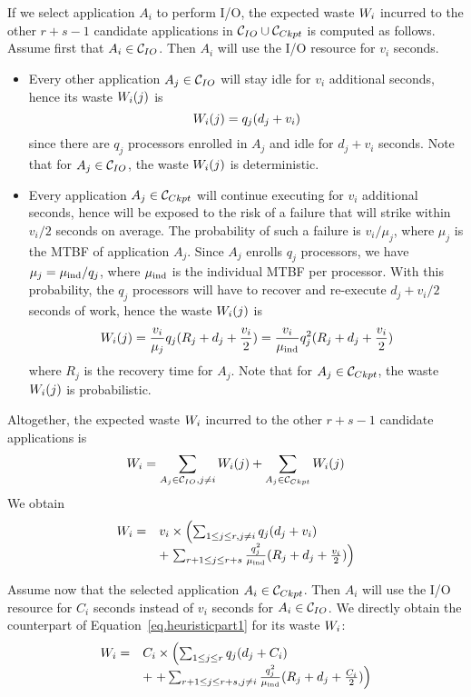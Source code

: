If we select application $A_{i}$ to perform I/O,  the expected waste $W_{i}$ incurred
to the other $r+s-1$ candidate applications in  $\mathcal{C}_{IO} \cup \mathcal{C}_{Ckpt}$ is computed as follows.
Assume first that $A_{i} \in \mathcal{C}_{IO}$. Then  $A_{i}$ will use the I/O resource for $v_{i}$ seconds.
\begin{itemize}
  \item Every other application $A_{j} \in \mathcal{C}_{IO}$ will stay idle for $v_{i}$ additional seconds,
  hence its waste $W_{i}(j)$ is
  $$W_{i}(j) = q_{j} (d_{j} + v_{i})$$
  since there are $q_{j}$ processors enrolled in $A_{j}$ and idle for $d_{j} + v_{i}$ seconds. Note that for $A_{j} \in \mathcal{C}_{IO}$, the waste $W_{i}(j)$ is deterministic.
  \item Every application $A_{j} \in \mathcal{C}_{Ckpt}$ will continue executing for $v_{i}$ additional seconds, hence will be exposed to the risk of a failure that will strike within $v_{i}/2$ seconds on average. The probability of such a failure is $v_{i}/\mu_{j}$, where $\mu_{j}$ is the
  MTBF of application $A_{j}$. Since $A_{j}$ enrolls $q_{j}$ processors, we have $\mu_{j} = \mu_{\text{ind}}/q_{j}$, where $\mu_{\text{ind}}$ is the individual MTBF per processor. With this probability,
  the $q_{j}$ processors will have to recover and re-execute $d_{j} + v_{i}/2$ seconds of work,
  hence the waste $W_{i}(j)$ is
     $$W_{i}(j) = \frac{v_{i}}{\mu_{j} } q_{j} (R_{j} + d_{j} + \frac{v_{i}}{2}) =
     \frac{v_{i}}{\mu_{\text{ind}}} q^{2}_{j} (R_{j} + d_{j} + \frac{v_{i}}{2})$$
     where $R_{j}$ is the recovery time for $A_{j}$.
Note that for $A_{j} \in \mathcal{C}_{Ckpt}$, the waste $W_{i}(j)$ is probabilistic.
 \end{itemize}
 Altogether, the expected waste $W_{i}$ incurred
to the other $r+s-1$ candidate applications is
$$W_{i} = \sum_{A_{j} \in \mathcal{C}_{IO}, j\neq i} W_{i}(j) + \sum_{A_{j} \in \mathcal{C}_{Ckpt}} W_{i}(j)$$
We obtain
\begin{equation}
\label{eq.heuristicpart1}
\begin{array}{ll}
 W_{i} = & v_{i} \times \left( \sum_{1 \leq j \leq r, j\neq i} q_{j} (d_{j} + v_{i}) \right.\\
 & + \left. \sum_{r+1 \leq j \leq r+s}   \frac{q^{2}_{j}}{\mu_{\text{ind}}} (R_{j} + d_{j} + \frac{v_{i}}{2}) \right)
 \end{array}
\end{equation}

 Assume now that the selected application $A_{i} \in \mathcal{C}_{Ckpt}$. Then  $A_{i}$ will use the I/O resource for $C_{i}$ seconds instead of $v_{i}$ seconds for $A_{i} \in \mathcal{C}_{IO}$. We directly obtain the counterpart of Equation~\eqref{eq.heuristicpart1} for its waste $W_{i}$:
 \begin{equation}
  \label{eq.heuristicpart2}
\begin{array}{ll}
 W_{i} = &  C_{i} \times \left( \sum_{1 \leq j \leq r} q_{j} (d_{j} + C_{i}) \right.\\
 & + \left.  + \sum_{r+1 \leq j \leq r+s, j\neq i}   \frac{q^{2}_{j}}{\mu_{\text{ind}}} (R_{j} + d_{j} + \frac{C_{i}}{2}) \right)
  \end{array}
\end{equation}

